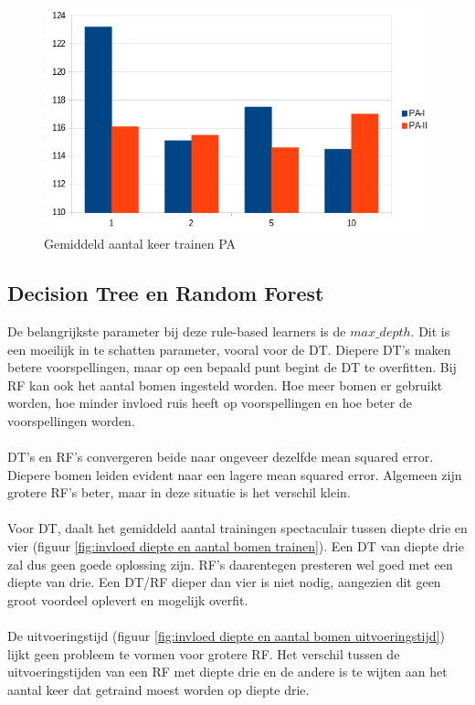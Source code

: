 \newpage
\begin{figure}[t]
	\includegraphics[width=\linewidth]{images/evaluatie/aantalkeertrainenpa.png}
	\caption{Gemiddeld aantal keer trainen PA}
	\label{fig:gemiddeld aantal keer trainen pa}
\end{figure}
\subsection{Decision Tree en Random Forest}
De belangrijkste parameter bij deze rule-based learners is de $max\_ depth$. Dit is een moeilijk in te schatten parameter, vooral voor de DT. Diepere DT’s maken betere voorspellingen, maar op een bepaald punt begint de DT te overfitten. Bij RF kan ook het aantal bomen ingesteld worden. Hoe meer bomen er gebruikt worden, hoe minder invloed ruis heeft op voorspellingen en hoe beter de voorspellingen worden.
\\\\
DT’s en RF’s convergeren beide naar ongeveer dezelfde mean squared error. Diepere bomen leiden evident naar een lagere mean squared error. Algemeen zijn grotere RF’s beter, maar in deze situatie is het verschil klein.
\\\\
Voor DT, daalt het gemiddeld aantal trainingen spectaculair tussen diepte drie en vier (figuur \ref{fig:invloed diepte en aantal bomen trainen}). Een DT van diepte drie zal dus geen goede oplossing zijn. RF’s daarentegen presteren wel goed met een diepte van drie. Een DT/RF dieper dan vier is niet nodig, aangezien dit geen groot voordeel oplevert en mogelijk overfit.
\\\\
De uitvoeringstijd (figuur \ref{fig:invloed diepte en aantal bomen uitvoeringstijd}) lijkt geen probleem te vormen voor grotere RF. Het verschil tussen de uitvoeringstijden van een RF met diepte drie en de andere is te wijten aan het aantal keer dat getraind moest worden op diepte drie.

